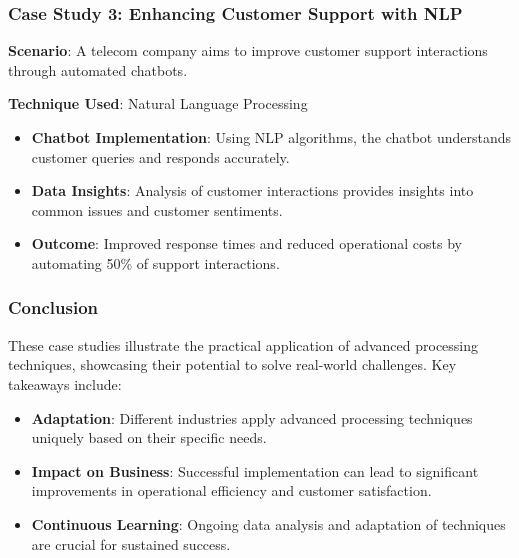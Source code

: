 \documentclass[aspectratio=169]{beamer}
\begin{document}
\begin{frame}[fragile]
    \frametitle{Case Study 3: Enhancing Customer Support with NLP}
    \textbf{Scenario}: A telecom company aims to improve customer support interactions through automated chatbots.
    
    \textbf{Technique Used}: Natural Language Processing
    
    \begin{itemize}
        \item \textbf{Chatbot Implementation}: Using NLP algorithms, the chatbot understands customer queries and responds accurately.
        \item \textbf{Data Insights}: Analysis of customer interactions provides insights into common issues and customer sentiments.
        \item \textbf{Outcome}: Improved response times and reduced operational costs by automating 50\% of support interactions.
    \end{itemize}
\end{frame}

\begin{frame}[fragile]
    \frametitle{Conclusion}
    These case studies illustrate the practical application of advanced processing techniques, showcasing their potential to solve real-world challenges. Key takeaways include:
    \begin{itemize}
        \item \textbf{Adaptation}: Different industries apply advanced processing techniques uniquely based on their specific needs.
        \item \textbf{Impact on Business}: Successful implementation can lead to significant improvements in operational efficiency and customer satisfaction.
        \item \textbf{Continuous Learning}: Ongoing data analysis and adaptation of techniques are crucial for sustained success.
    \end{itemize}
\end{frame}
\end{document}
